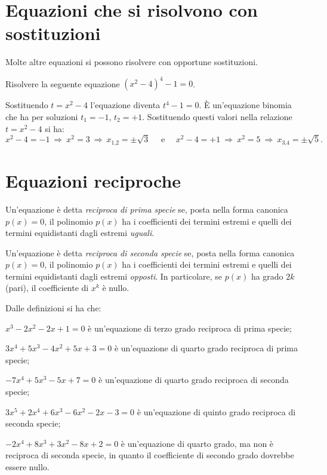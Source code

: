 \section{Equazioni che si risolvono con sostituzioni}

Molte altre equazioni si possono risolvere con opportune sostituzioni.
\begin{exrig}
\begin{esempio}
Risolvere la seguente equazione $ \left(x^2-4\right)^4-1=0 $.

Sostituendo $t=x^2-4$ l'equazione diventa $t^4-1=0$. È un'equazione binomia che ha per soluzioni $t_1=-1$, $t_2=+1$. Sostituendo questi valori nella relazione $t=x^2-4$ si ha: 
\[x^2-4=-1\:\Rightarrow\: x^2=3\:\Rightarrow\: x_{1\text{,}2}=\pm \sqrt 3\quad\text{ e }\quad x^2-4=+1\:\Rightarrow\: x^2=5\:\Rightarrow\: x_{3\text{,}4}=\pm \sqrt 5.\]
\end{esempio}
\end{exrig}
\ovalbox{\risolvii \ref{ese:5.30}, \ref{ese:5.31}, \ref{ese:5.32}, \ref{ese:5.33},\ref{ese:5.34}, \ref{ese:5.35}}

\section{Equazioni reciproche}

\begin{definizione}
Un'equazione è detta \emph{reciproca di prima specie} se, posta nella forma canonica $p(x)=0$, il polinomio $p(x)$ ha i coefficienti dei termini estremi e quelli dei termini equidistanti dagli estremi \emph{uguali}.
\end{definizione}

\begin{definizione}
Un'equazione è detta \emph{reciproca di seconda specie} se, posta nella forma canonica $p(x)=0$, il polinomio $p(x)$ ha i coefficienti dei termini estremi e quelli dei termini equidistanti dagli estremi \emph{opposti}. In particolare, se $p(x)$ ha grado $2k$ (pari), il coefficiente di $x^k$ è nullo.
\end{definizione}

Dalle definizioni si ha che:

\begin{itemize*}
\item $x^3-2x^2-2x+1=0$ è un'equazione di terzo grado reciproca di prima specie;
\item $3x^4+5x^3-4x^2+5x+3=0$ è un'equazione di quarto grado reciproca di prima specie;
\item $-7x^4+5x^3-5x+7=0$ è un'equazione di quarto grado reciproca di seconda specie;
\item $3x^5+2x^4+6x^3-6x^2-2x-3=0$ è un'equazione di quinto grado reciproca di seconda specie;
\item $-2x^4+8x^3+3x^2-8x+2=0$ è un'equazione di quarto grado, ma non è reciproca di seconda specie, in quanto il coefficiente di secondo grado dovrebbe essere nullo.
\end{itemize*}

